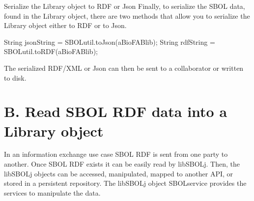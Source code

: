 \begin{DoxyEnumerate}
\item \begin{DoxyParagraph}{Serialize the Library object to RDF or Json}
Finally, to serialize the SBOL data, found in the Library object, there are two methods that allow you to serialize the Library object either to RDF or to Json. 
\begin{DoxyCode}
String jsonString = SBOLutil.toJson(aBioFABlib);
String rdfString = SBOLutil.toRDF(aBioFABlib);
\end{DoxyCode}

\end{DoxyParagraph}
The serialized RDF/XML or Json can then be sent to a collaborator or written to disk.
\end{DoxyEnumerate}



 \hypertarget{tutorial_B}{}\section{B. Read SBOL RDF data into a Library object}\label{tutorial_B}
In an information exchange use case SBOL RDF is sent from one party to another. Once SBOL RDF exists it can be easily read by libSBOLj. Then, the libSBOLj objects can be accessed, manipulated, mapped to another API, or stored in a persistent repository. The libSBOLj object SBOLservice provides the services to manipulate the data.


